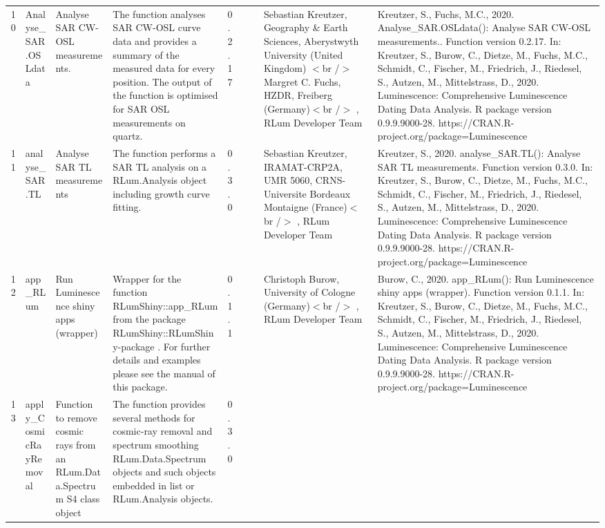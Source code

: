 \begin{table}[ht]
\begin{tabular}{rllllllll}
 \\ 
  10 & Analyse\_SAR.OSLdata & Analyse SAR CW-OSL measurements. & The function analyses SAR CW-OSL curve data and provides a summary of the measured data for every position. The output of the function is optimised for SAR OSL measurements on quartz. & 0.2.17
 &  &  & Sebastian Kreutzer, Geography \& Earth Sciences, Aberystwyth University (United Kingdom) $<$br /$>$ Margret C. Fuchs, HZDR, Freiberg (Germany)$<$br /$>$ , RLum Developer Team & Kreutzer, S., Fuchs, M.C., 2020. Analyse\_SAR.OSLdata(): Analyse SAR CW-OSL measurements.. Function version 0.2.17. In: Kreutzer, S., Burow, C., Dietze, M., Fuchs, M.C., Schmidt, C., Fischer, M., Friedrich, J., Riedesel, S., Autzen, M., Mittelstrass, D., 2020. Luminescence: Comprehensive Luminescence Dating Data Analysis. R package version 0.9.9.9000-28. https://CRAN.R-project.org/package=Luminescence
 \\ 
  11 & analyse\_SAR.TL & Analyse SAR TL measurements & The function performs a SAR TL analysis on a RLum.Analysis  object including growth curve fitting. & 0.3.0
 &  &  & Sebastian Kreutzer, IRAMAT-CRP2A, UMR 5060, CRNS-Universite Bordeaux Montaigne (France)$<$br /$>$ , RLum Developer Team & Kreutzer, S., 2020. analyse\_SAR.TL(): Analyse SAR TL measurements. Function version 0.3.0. In: Kreutzer, S., Burow, C., Dietze, M., Fuchs, M.C., Schmidt, C., Fischer, M., Friedrich, J., Riedesel, S., Autzen, M., Mittelstrass, D., 2020. Luminescence: Comprehensive Luminescence Dating Data Analysis. R package version 0.9.9.9000-28. https://CRAN.R-project.org/package=Luminescence
 \\ 
  12 & app\_RLum & Run Luminescence shiny apps (wrapper) & Wrapper for the function  RLumShiny::app\_RLum  from the package RLumShiny::RLumShiny-package . For further details and examples please see the manual of this package. & 0.1.1
 &  &  & Christoph Burow, University of Cologne (Germany)$<$br /$>$ , RLum Developer Team & Burow, C., 2020. app\_RLum(): Run Luminescence shiny apps (wrapper). Function version 0.1.1. In: Kreutzer, S., Burow, C., Dietze, M., Fuchs, M.C., Schmidt, C., Fischer, M., Friedrich, J., Riedesel, S., Autzen, M., Mittelstrass, D., 2020. Luminescence: Comprehensive Luminescence Dating Data Analysis. R package version 0.9.9.9000-28. https://CRAN.R-project.org/package=Luminescence
 \\ 
  13 & apply\_CosmicRayRemoval & Function to remove cosmic rays from an RLum.Data.Spectrum S4 class object & The function provides several methods for cosmic-ray removal and spectrum smoothing  RLum.Data.Spectrum  objects and such objects embedded in  list  or RLum.Analysis  objects. & 0.3.0

\end{tabular}
\end{table}
